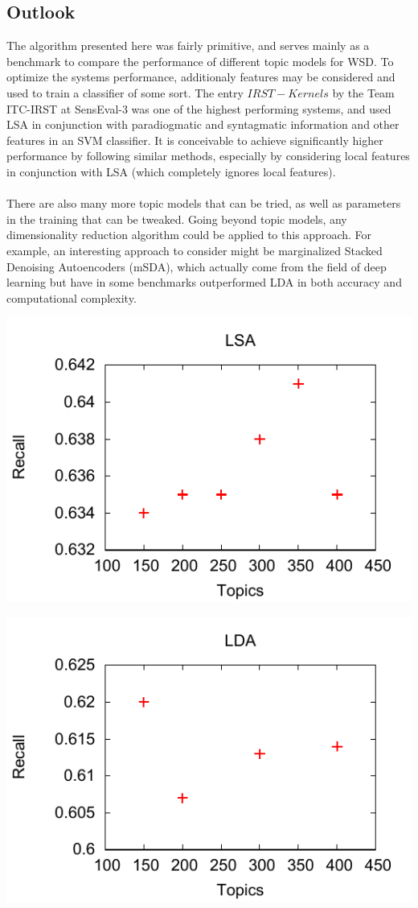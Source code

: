 \subsection{Outlook}
The algorithm presented here was fairly primitive, and serves mainly as a benchmark to compare the performance of different topic models for WSD. To optimize the systems performance, additionaly features may be considered and used to train a classifier of some sort. The entry $IRST-Kernels$ by the Team ITC-IRST at SensEval-3 was one of the highest performing systems, and used LSA in conjunction with paradiogmatic and syntagmatic information and other features in an SVM classifier\cite{senseval3paper}. It is conceivable to achieve significantly higher performance by following similar methods, especially by considering local features in conjunction with LSA (which completely ignores local features).\\\\
There are also many more topic models that can be tried, as well as parameters in the training that can be tweaked. Going beyond topic models, any dimensionality reduction algorithm could be applied to this approach. For example, an interesting approach to consider might be marginalized Stacked Denoising Autoencoders (mSDA), which actually come from the field of deep learning but have in some benchmarks outperformed LDA in both accuracy and computational complexity.


\includegraphics{plot/lsa.pdf}

\includegraphics{plot/lda.pdf}
